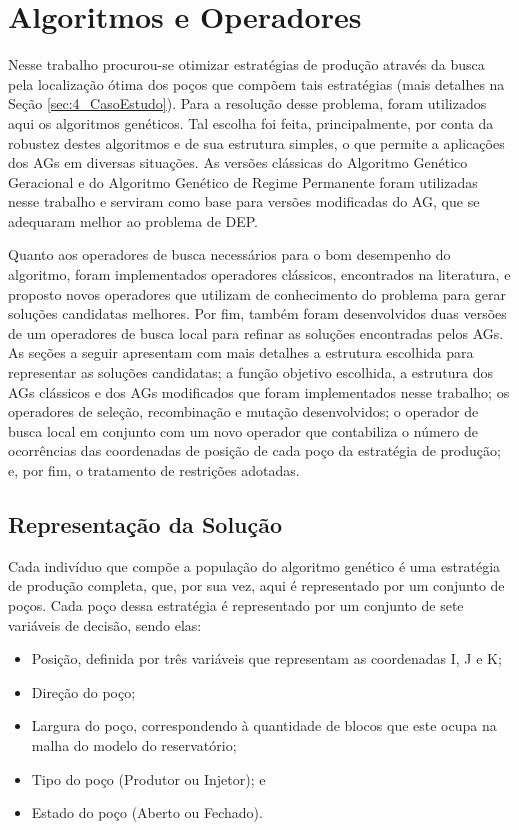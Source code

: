 \chapter{Algoritmos e Operadores}
\label{ch:3_AlgoritmosOperadores}
Nesse trabalho procurou-se otimizar estratégias de produção através da busca pela localização ótima dos poços que compõem tais estratégias (mais detalhes na Seção \ref{sec:4_CasoEstudo}). Para a resolução desse problema, foram utilizados aqui os algoritmos genéticos. Tal escolha foi feita, principalmente, por conta da robustez destes algoritmos e de sua estrutura simples, o que permite a aplicações dos AGs em diversas situações. As versões clássicas do Algoritmo Genético Geracional e do Algoritmo Genético de Regime Permanente foram utilizadas nesse trabalho e serviram como base para versões modificadas do AG, que se adequaram melhor ao problema de DEP.

Quanto aos operadores de busca necessários para o bom desempenho do algoritmo, foram implementados operadores clássicos, encontrados na literatura, e proposto novos operadores que utilizam de conhecimento do problema para gerar soluções candidatas melhores. Por fim, também foram desenvolvidos duas versões de um operadores de busca local para refinar as soluções encontradas pelos AGs. As seções a seguir apresentam com mais detalhes a estrutura escolhida para representar as soluções candidatas; a função objetivo escolhida, a estrutura dos AGs clássicos e dos AGs modificados que foram implementados nesse trabalho; os operadores de seleção, recombinação e mutação desenvolvidos; o operador de busca local em conjunto com um novo operador que contabiliza o número de ocorrências das coordenadas de posição de cada poço da estratégia de produção; e, por fim, o tratamento de restrições adotadas.  

\section{Representação da Solução}
\label{sec:3_Representacao}
Cada indivíduo que compõe a população do algoritmo genético é uma estratégia de produção completa, que, por sua vez, aqui é representado por um conjunto de poços. Cada poço dessa estratégia é representado por um conjunto de sete variáveis de decisão, sendo elas:

\begin{itemize}

\item Posição, definida por três variáveis que representam as coordenadas I, J e K;
\item Direção do poço;
\item Largura do poço, correspondendo à quantidade de blocos que este ocupa na malha do modelo do reservatório; 
\item Tipo do poço (Produtor ou Injetor); e
\item Estado do poço (Aberto ou Fechado).

\end{itemize}

